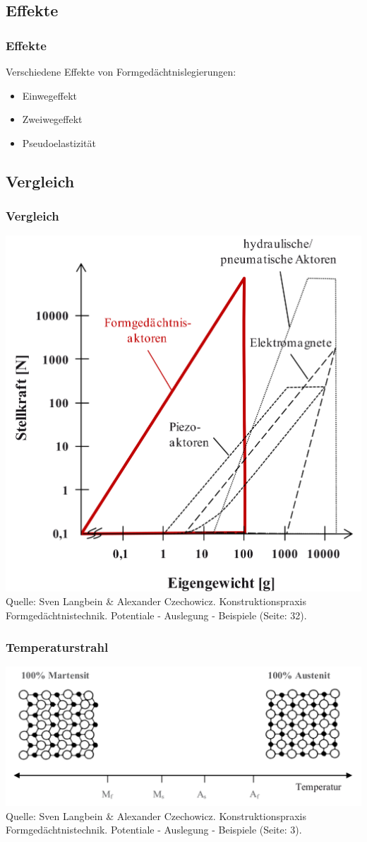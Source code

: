 \begin{frame}[c]
\begin{figure}
\begin{minipage}{0.45\textwidth}
		\end{minipage}
	\end{figure}
 \end{frame}

\subsection{Effekte}
\label{fgl:effekte}
\begin{frame}[c]\frametitle{Effekte}
	Verschiedene Effekte von Formgedächtnislegierungen:
	\begin{itemize}
		\item{Einwegeffekt}
		\item{Zweiwegeffekt}
		\item{Pseudoelastizität}
	\end{itemize}
\end{frame}

\subsection{Vergleich}
\begin{frame}[c]\frametitle{Vergleich}
	\centering
	\includegraphics[height=0.5\textwidth]{medien/Verschiedene_Aktorprinzipien.png}
	\\
	\tiny{Quelle: Sven Langbein \& Alexander Czechowicz. Konstruktionspraxis
	Formgedächtnistechnik. Potentiale - Auslegung - Beispiele (Seite: 32).}
\end{frame}

\begin{frame}[c]\frametitle{Temperaturstrahl}
	\centering
	\includegraphics[height=0.35\textwidth]{medien/Umwandlung_anhand_des_Temperaturstrahls.png}
	\\
	\tiny{Quelle: Sven Langbein \& Alexander Czechowicz. Konstruktionspraxis
	Formgedächtnistechnik. Potentiale - Auslegung - Beispiele (Seite: 3).}
\end{frame}


